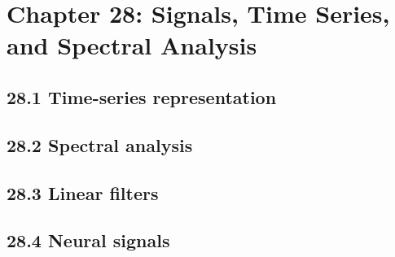 \section{Chapter 28: Signals, Time Series, and Spectral Analysis}

\subsection{28.1 Time-series representation}

\subsection{28.2 Spectral analysis}

\subsection{28.3 Linear filters}

\subsection{28.4 Neural signals}

\clearpage
